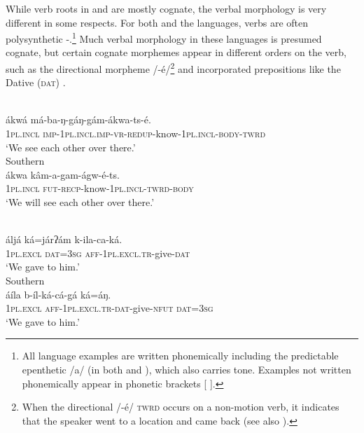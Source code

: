 \documentclass[output=paper]{langsci/langscibook}
\begin{document}
While verb roots in  and  are mostly cognate, the verbal morphology is very different in some respects. For both  and the  languages, verbs are often polysynthetic -.\footnote{All language examples are written phonemically including the predictable epenthetic /a/ (in both  and ), which also carries tone. Examples not written phonemically appear in phonetic brackets [ ].} Much verbal morphology in these languages is presumed cognate, but certain cognate morphemes appear in different orders on the verb, such as the directional morpheme /-é/\footnote{When the directional /-\'{e}/ \textsc{twrd} occurs on a non-motion verb, it indicates that the speaker went to a location and came back (see also \citealt{Ahland2012Gumuz}).}  and incorporated prepositions like the Dative (\textsc{dat}) .

\newpage 
\ea\label{ex:ahlandc:1}
\ea\label{ex:ahlandc:1a}  
  \\
\gll
ákwá    má-ba-ŋ-gáŋ-gám-ákwa-ts-é.\\
\textsc{1pl.incl}   \textsc{imp-1pl.incl.imp-vr-redup}-know-\textsc{1pl.incl-body-twrd}\\
\glt ‘We see each other over there.’ \\

  
\ex\label{ex:ahlandc:1b}  
Southern  \\
\gll
 ákwa    kâm-a-gam-ágw-é-ts. \\
  \textsc{1pl.incl}   \textsc{fut-recp-}know-\textsc{1pl.incl-twrd-body}\\ 
\glt ‘We will see each other over there.’
\z
\z

\ea\label{ex:ahlandc:2}
\ea\label{ex:ahlandc:2a} 
\\
\gll
áljá                 ká=járʔám        k-ila-ca-ká.  \\
\textsc{1pl.excl} \textsc{dat}=\textsc{3sg}   \textsc{aff-1pl.excl.tr-}give-\textsc{dat} \\
\glt ‘We gave to him.’ \\

\newpage 
\ex\label{ex:ahlandc:2b}  
Southern  \\
\gll
  áíla                 b-íl-ká-cá-gá  ká=áŋ. \\
\textsc{1pl.excl} \textsc{aff-1pl.excl.tr-dat-}give-\textsc{nfut}  \textsc{dat=3sg} \\
\glt ‘We gave to him.’
\z
\z
\end{document}
